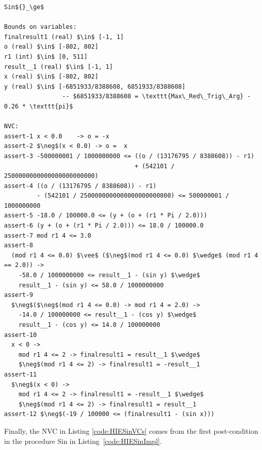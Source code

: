 \documentclass[runningheads]{llncs}
\begin{document}
\begin{lstlisting}[caption=Selected Sin NVC, label={code:HIESinVCs},basicstyle=\fontsize{7.5}{9pt}\tt,float=t]
Sin${}_\ge$

Bounds on variables:
finalresult1 (real) $\in$ [-1, 1]
o (real) $\in$ [-802, 802]
r1 (int) $\in$ [0, 511]
result__1 (real) $\in$ [-1, 1]
x (real) $\in$ [-802, 802]
y (real) $\in$ [-6851933/8388608, 6851933/8388608] 
                -- $6851933/8388608 = \texttt{Max\_Red\_Trig\_Arg} - 0.26 * \texttt{pi}$

NVC:
assert-1 x < 0.0    -> o = -x
assert-2 $\neg$(x < 0.0) -> o =  x
assert-3 -500000001 / 1000000000 <= ((o / (13176795 / 8388608)) - r1)
                                    + (542101 / 2500000000000000000000000)
assert-4 ((o / (13176795 / 8388608)) - r1) 
         - (542101 / 2500000000000000000000000) <= 500000001 / 1000000000
assert-5 -18.0 / 100000.0 <= (y + (o + (r1 * Pi / 2.0)))
assert-6 (y + (o + (r1 * Pi / 2.0))) <= 18.0 / 100000.0
assert-7 mod r1 4 <= 3.0
assert-8 
  (mod r1 4 <= 0.0) $\vee$ ($\neg$(mod r1 4 <= 0.0) $\wedge$ (mod r1 4 == 2.0)) ->
    -58.0 / 1000000000 <= result__1 - (sin y) $\wedge$
    result__1 - (sin y) <= 58.0 / 1000000000
assert-9
  $\neg$($\neg$(mod r1 4 <= 0.0) -> mod r1 4 = 2.0) ->
    -14.0 / 100000000 <= result__1 - (cos y) $\wedge$
    result__1 - (cos y) <= 14.0 / 100000000
assert-10
  x < 0 ->
    mod r1 4 <= 2 -> finalresult1 = result__1 $\wedge$
    $\neg$(mod r1 4 <= 2) -> finalresult1 = -result__1
assert-11
  $\neg$(x < 0) ->
    mod r1 4 <= 2 -> finalresult1 = -result__1 $\wedge$
    $\neg$(mod r1 4 <= 2) -> finalresult1 = result__1
assert-12 $\neg$(-19 / 100000 <= (finalresult1 - (sin x)))
\end{lstlisting}
Finally, the NVC in Listing \ref{code:HIESinVCs} comes from the first post-condition in the procedure Sin in Listing~\ref{code:HIESinImpl}.
\end{document}

